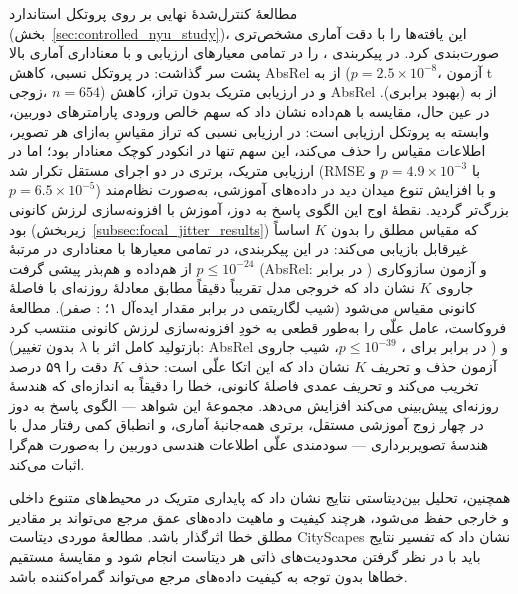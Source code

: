 مطالعهٔ کنترل‌شدهٔ نهایی بر روی پروتکل استاندارد 
(بخش~\ref{sec:controlled_nyu_study})، این یافته‌ها را با دقت آماری مشخص‌تری صورت‌بندی کرد.
\proposedmodel{} در پیکربندی ،
\publishedbasemodel{} را
در تمامی معیارهای ارزیابی و با معناداری آماری بالا پشت سر گذاشت:
در پروتکل نسبی، کاهش AbsRel از  به 
($p=2.5\times10^{-8}$، آزمون t زوجی، $n=654$)
و در ارزیابی متریک بدون تراز،
کاهش AbsRel از  به  (بهبود  برابری).
در عین حال، مقایسه با \controlmodel{} هم‌داده نشان داد که
سهم خالص ورودی پارامترهای دوربین،
وابسته به پروتکل ارزیابی است:
در ارزیابی نسبی که تراز مقیاسِ به‌ازای هر تصویر،
اطلاعات مقیاس را حذف می‌کند،
این سهم تنها در انکودر کوچک معنادار بود؛
اما در ارزیابی متریک،
برتری \proposedmodel{} در دو اجرای مستقل تکرار شد
(RMSE با $p=4.9\times10^{-3}$ و $p=6.5\times10^{-5}$)
و با افزایش تنوع میدان دید در داده‌های آموزشی،
به‌صورت نظام‌مند بزرگ‌تر گردید.
نقطهٔ اوج این الگوی پاسخ به دوز،
آموزش با افزونه‌سازی لرزش کانونی بود
(زیربخش~\ref{subsec:focal_jitter_results})
که مقیاس مطلق را بدون $K$ اساساً غیرقابل بازیابی می‌کند:
در این پیکربندی، \proposedmodel{}
در تمامی معیارها با معناداری در مرتبهٔ $p \le 10^{-24}$
از \controlmodel{} هم‌داده و هم‌بذر پیشی گرفت
(AbsRel:  در برابر )
و آزمون سازوکاری جاروی $K$ نشان داد که
خروجی مدل تقریباً دقیقاً مطابق معادلهٔ روزنه‌ای
با فاصلهٔ کانونی مقیاس می‌شود
(شیب لگاریتمی  در برابر مقدار ایده‌آل ۱؛
\controlmodel{}: صفر).
مطالعهٔ فروکاست، عامل علّی را به‌طور قطعی
به خودِ افزونه‌سازی لرزش کانونی منتسب کرد
(بازتولید کامل اثر با $\lambda$ بدون تغییر:
AbsRel  در برابر  برای \controlmodel{}، $p \le 10^{-39}$،
شیب جاروی )
و آزمون حذف و تحریف $K$ نشان داد که
این اتکا علّی است:
حذف $K$ دقت را ۵۹ درصد تخریب می‌کند
و تحریف عمدی فاصلهٔ کانونی،
خطا را دقیقاً به اندازه‌ای که هندسهٔ روزنه‌ای
پیش‌بینی می‌کند افزایش می‌دهد.
مجموعهٔ این شواهد --- الگوی پاسخ به دوز در چهار زوج آموزشی مستقل،
برتری همه‌جانبهٔ آماری،
و انطباق کمی رفتار مدل با هندسهٔ تصویربرداری ---
سودمندی علّی اطلاعات هندسی دوربین را
به‌صورت هم‌گرا اثبات می‌کند.

همچنین،
تحلیل بین‌دیتاستی نتایج نشان داد که
پایداری متریک \proposedmodel{}
در محیط‌های متنوع داخلی و خارجی حفظ می‌شود،
هرچند کیفیت و ماهیت داده‌های عمق مرجع
می‌تواند بر مقادیر مطلق خطا اثرگذار باشد.
مطالعهٔ موردی دیتاست CityScapes
نشان داد که تفسیر نتایج
باید با در نظر گرفتن محدودیت‌های ذاتی هر دیتاست انجام شود
و مقایسهٔ مستقیم خطاها
بدون توجه به کیفیت داده‌های مرجع
می‌تواند گمراه‌کننده باشد.

